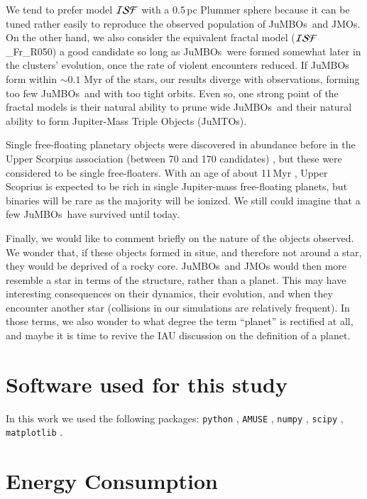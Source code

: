 \documentclass[submission,phys]{lib/SciPost}
\newcommand{\jumbos}{\mbox{JuMBOs}}
\begin{document}
We tend to prefer model ${\cal ISF}$ with a 0.5\,pc Plummer sphere
because it can be tuned rather easily to reproduce the observed
population of \jumbos\, and JMOs. On the other hand, we also consider
the equivalent fractal model (${\cal ISF}$\_Fr\_R050) a good candidate
so long as \jumbos\ were formed somewhat later in the clusters'
evolution, once the rate of violent encounters reduced.  If \jumbos\,
form within $\sim 0.1$ Myr of the stars, our results diverge with
observations, forming too few \jumbos\, and with too tight
orbits. Even so, one strong point of the fractal models is their
natural ability to prune wide \jumbos\, and their natural ability to
form Jupiter-Mass Triple Objects (JuMTOs).

Single free-floating planetary objects were discovered in abundance
before in the Upper Scorpius association (between 70 and 170
candidates) \cite{2022NatAs...6...89M}, but these were considered to
be single free-floaters.  With an age of about 11\,Myr
\cite{2022NatAs...6...89M}, Upper Scoprius is expected to be rich in
single Jupiter-mass free-floating planets, but binaries will be rare
as the majority will be ionized. We still could imagine that a few
\jumbos\, have survived until today.

Finally, we would like to comment briefly on the nature of the objects
observed. We wonder that, if these objects formed in situe, and
therefore not around a star, they would be deprived of a rocky core.
\jumbos\, and JMOs would then more resemble a star in terms of the
structure, rather than a planet. This may have interesting
consequences on their dynamics, their evolution, and when they
encounter another star (collisions in our simulations are relatively
frequent). In those terms, we also wonder to what degree the term
``planet'' is rectified at all, and maybe it is time to revive the IAU
discussion on the definition of a planet.

\section*{Software used for this study}

In this work we used the following packages: \texttt{python}
\cite{10.5555/1593511}, \texttt{AMUSE} \cite{2018araa.book.....P},
\texttt{numpy} \cite{Oliphant2006ANumPy}, \texttt{scipy}
\cite{2020SciPy-NMeth}, \texttt{matplotlib}
\cite{2007CSE.....9...90H}.

\section*{Energy Consumption}
\end{document}
